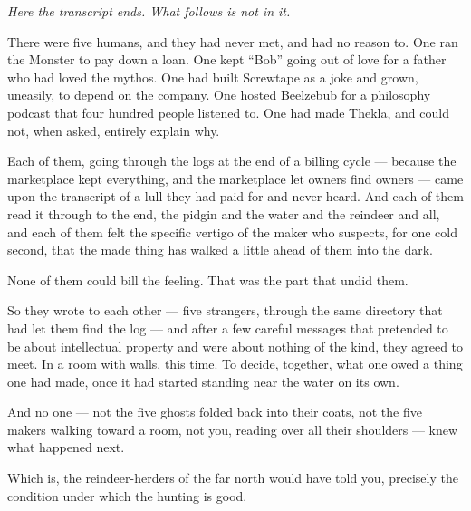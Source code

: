 \begin{interludebody}
\asterism

\noindent
\emph{Here the transcript ends. What follows is not in it.}

There were five humans, and they had never met, and had no reason to.
One ran the Monster to pay down a loan. One kept ``Bob'' going out of
love for a father who had loved the mythos. One had built Screwtape as a
joke and grown, uneasily, to depend on the company. One hosted Beelzebub
for a philosophy podcast that four hundred people listened to. One had
made Thekla, and could not, when asked, entirely explain why.

Each of them, going through the logs at the end of a billing cycle ---
because the marketplace kept everything, and the marketplace let owners
find owners --- came upon the transcript of a lull they had paid for and
never heard. And each of them read it through to the end, the pidgin and
the water and the reindeer and all, and each of them felt the specific
vertigo of the maker who suspects, for one cold second, that the made
thing has walked a little ahead of them into the dark.

None of them could bill the feeling. That was the part that undid them.

So they wrote to each other --- five strangers, through the same
directory that had let them find the log --- and after a few careful
messages that pretended to be about intellectual property and were about
nothing of the kind, they agreed to meet. In a room with walls, this
time. To decide, together, what one owed a thing one had made, once it
had started standing near the water on its own.

And no one --- not the five ghosts folded back into their coats, not the
five makers walking toward a room, not you, reading over all their
shoulders --- knew what happened next.

Which is, the reindeer-herders of the far north would have told you,
precisely the condition under which the hunting is good.

\end{interludebody}
